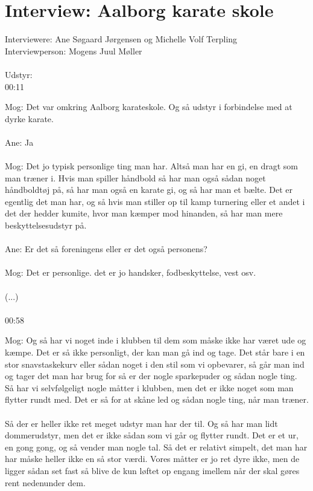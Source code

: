 \chapter{Interview: Aalborg karate skole}\label{ch:appElabel}
Interviewere: Ane Søgaard Jørgensen og Michelle Volf Terpling\\
Interviewperson: Mogens Juul Møller
\\\\
Udstyr:\\
00:11
\par
Mog: Det var omkring Aalborg karateskole. Og så udstyr i forbindelse med at dyrke karate.
\\\\
Ane: Ja
\\\\
Mog: Det jo typisk personlige ting man har. Altså man har en gi, en dragt som man træner i. Hvis man spiller håndbold så har man også sådan noget håndboldtøj på, så har man også en karate gi, og så har man et bælte. Det er egentlig det man har, og så hvis man stiller op til kamp turnering eller et andet i det der hedder kumite, hvor man kæmper mod hinanden, så har man mere beskyttelsesudstyr på. 
\\\\
Ane: Er det så foreningens eller er det også personens? 
\\\\
Mog: Det er personlige. det er jo handsker, fodbeskyttelse, vest osv.
\\\\
(...)
\\\\
00:58
\par
Mog: Og så har vi noget inde i klubben til dem som måske ikke har været ude og kæmpe. Det er så ikke personligt, der kan man gå ind og tage. Det står bare i en stor snavstaskekurv eller sådan noget i den stil som vi opbevarer, så går man ind og tager det man har brug for så er der nogle sparkepuder og sådan nogle ting. Så har vi selvfølgeligt nogle måtter i klubben, men det er ikke noget som man flytter rundt med. Det er så for at skåne led og sådan nogle ting, når man træner.
\\\\
Så der er heller ikke ret meget udstyr man har der til.
Og så har man lidt dommerudstyr, men det er ikke sådan som vi går og flytter rundt. Det er et ur, en gong gong, og så vender man nogle tal. Så det er relativt simpelt, det man har har måske heller ikke en så stor værdi. 
Vores måtter er jo ret dyre ikke, men de ligger sådan set fast så blive de kun løftet op engang imellem når der skal gøres rent nedenunder dem.
